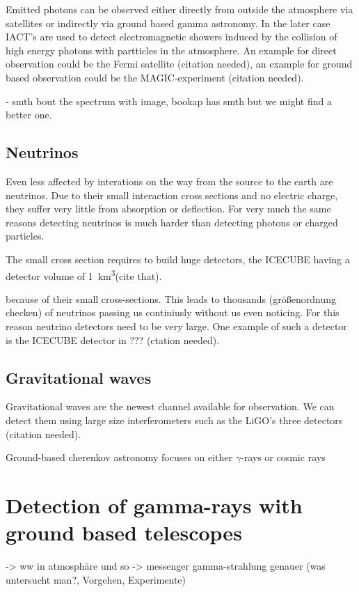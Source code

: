 Emitted photons can be observed either directly
from outside the atmosphere via satellites or indirectly
via ground based gamma astronomy. In the later case
IACT's are used to detect electromagnetic showers induced
by the collision of high energy photons with partticles in the atmosphere.
An example for direct observation could be the Fermi satellite (citation needed),
an example for ground based observation could be the
MAGIC-experiment (citation needed).

- smth bout the spectrum with image, bookap has smth but we might find a better one.

\subsection{Neutrinos}
Even less affected by interations on the way from the source to the earth are neutrinos.
Due to their small interaction cross sections and no electric charge, they 
suffer very little from absorption or deflection.
For very much the same reasons detecting neutrinos is much harder
than detecting photons or charged particles.

The small cross section requires to build huge detectors, 
the ICECUBE having a detector volume of \SI{1}{\kilo\meter^3}(cite that).

because of
their small cross-sections. This leads to thousands (größenordnung checken) of
neutrinos passing us continiusly without us even noticing.
For this reason neutrino detectors need to be very large. One example
of such a detector is the ICECUBE detector in ??? (ctation needed).

\subsection{Gravitational waves}
Gravitational waves are the newest channel available for observation.
We can detect them using large size interferometers such as
the LiGO's three detectors (citation needed).



Ground-based cherenkov astronomy focuses on either $\gamma$-rays or cosmic rays


\section{Detection of gamma-rays with ground based telescopes}
-> ww in atmosphäre und so
-> messenger gamma-strahlung genauer (was untersucht man?, Vorgehen, Experimente)

